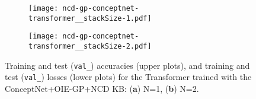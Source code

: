\documentclass[preprint]{elsarticle}
\begin{document}
\begin{figure}[htb]
	\centering
	\hspace*{\fill}
	\begin{subfigure}[b]{.48\linewidth}
		\centering
		\texttt{[image: ncd-gp-conceptnet-transformer\_\_stackSize-1.pdf]}
		\captionsetup{justification=centering}
		\caption{}
        \label{fig:ncd_gp_conceptnet_hist_plot_N1}
	\end{subfigure}
	\hspace*{\fill}
	\begin{subfigure}[b]{.48\linewidth}
		\centering
		\texttt{[image: ncd-gp-conceptnet-transformer\_\_stackSize-2.pdf]}
		\captionsetup{justification=centering}
		\caption{}
        \label{fig:ncd_gp_conceptnet_hist_plot_N2}
	\end{subfigure}
	\hspace*{\fill}
	\caption{Training and test (\texttt{val\_}) accuracies (upper plots), and training and test (\texttt{val\_}) losses (lower plots) for the Transformer trained with the ConceptNet+OIE-GP+NCD KB: (\textbf{a}) N=1, (\textbf{b}) N=2.}
	\label{fig:ncd_gp_conceptnet_hist_plot}
\end{figure}
\end{document}

